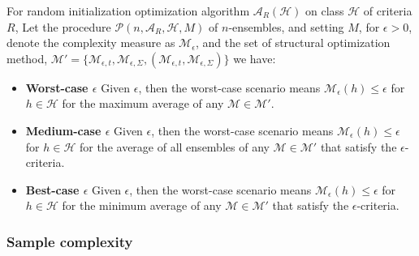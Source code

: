 \documentclass[10pt]{article} %
\begin{document}
\begin{definition}
    For random initialization optimization algorithm $\mathcal{A}_{R}(\mathcal{H})$ on class $\mathcal{H}$ of criteria $R$, Let the procedure $\mathcal{P}(n,\mathcal{A}_{R},\mathcal{H},M)$ of $n$-ensembles, and setting $M$, for $\epsilon>0$, denote the complexity measure as $\mathcal{M}_{\epsilon}$, and the set of structural optimization method, $\mathcal{M}'=\{\mathcal{M}_{\epsilon,t},\mathcal{M}_{\epsilon,\Sigma},(\mathcal{M}_{\epsilon,t},\mathcal{M}_{\epsilon,\Sigma})\}$ we have: 
    \begin{itemize}[topsep=1pt,itemsep=1pt,leftmargin = 1cm]
        \item \textbf{Worst-case $\epsilon$} Given $\epsilon$, then the worst-case scenario means $\mathcal{M}_{\epsilon}(h)\leq \epsilon$ for $h\in \mathcal{H}$ for the maximum average of any $\mathcal{M}\in\mathcal{M}'$. 
        \item \textbf{Medium-case $\epsilon$} Given $\epsilon$, then the worst-case scenario means $\mathcal{M}_{\epsilon}(h)\leq \epsilon$ for $h\in \mathcal{H}$ for the average of all ensembles of any $\mathcal{M}\in\mathcal{M}'$ that satisfy the $\epsilon$-criteria.
        \item \textbf{Best-case $\epsilon$} Given $\epsilon$, then the worst-case scenario means $\mathcal{M}_{\epsilon}(h)\leq \epsilon$ for $h\in \mathcal{H}$ for the minimum average of any $\mathcal{M}\in\mathcal{M}'$ that satisfy the $\epsilon$-criteria.
    \end{itemize}
\end{definition}

\subsubsection{Sample complexity}
\end{document}
